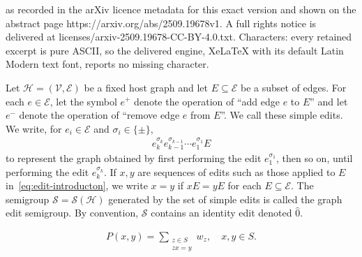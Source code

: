 \documentclass[10pt,a4paper]{amsart}
\begin{document}
as recorded in the arXiv licence metadata for this exact version and shown on the abstract page https://arxiv.org/abs/2509.19678v1. A full rights notice is delivered at licenses/arxiv-2509.19678-CC-BY-4.0.txt. Characters: every retained excerpt is pure ASCII, so the delivered engine, XeLaTeX with its default Latin Modern text font, reports no missing character.
\begin{definition}\label{def:graph-edit-semigroup}
    Let $\mathcal{H}=(\mathcal{V},\mathcal{E})$ be a fixed host graph and let $E\subseteq\mathcal{E}$ be a subset of edges. For each $e\in \mathcal{E}$, let the symbol ${e^+}$ denote the operation of ``add edge $e$ to $E$'' and let ${e^-}$ denote the operation of ``remove edge $e$ from $E$''. We call these {\normalfont simple edits}. We write, for $e_i\in {\mathcal{E}}$ and $\sigma_i\in\{\pm\}$,
        \begin{align}\label{eq:edit-introducton}
            e_k^{\sigma_k} e_{k-1}^{\sigma_{k-1}} \cdots e_{1}^{\sigma_1} E
        \end{align}
    to represent the graph obtained by {\normalfont first} performing the edit $e_{1}^{\sigma_1}$, then so on, until performing the edit $e_k^{\sigma_k}$. If $x, y$ are sequences of edits such as those applied to $E$ in~\cref{eq:edit-introducton}, we write $x = y$ if $xE = yE$ for each $E\subseteq\mathcal{E}$. The semigroup $\mathcal{S} = \mathcal{S}(\mathcal{H})$ generated by the set of simple edits is called the {\normalfont graph edit semigroup}. By convention, $\mathcal{S}$ contains an identity edit denoted $\widehat{0}$.
\end{definition}

    \begin{align}\label{eq:semi-rw}
        P(x, y) = \sum_{\substack{z\in S\\zx=y}} w_z, \quad x, y\in S.
    \end{align}
\end{document}
